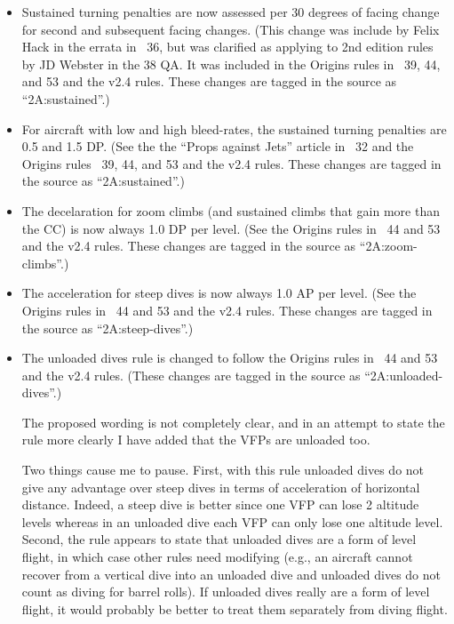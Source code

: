 \documentclass[10pt]{article}
\begin{document}
\begin{itemize}
    \item Sustained turning penalties are now assessed per 30 degrees of facing change for second and subsequent facing changes. (This change was include by Felix Hack in the errata in {\APJ}~36, but was clarified as applying to 2nd edition rules by JD Webster in the {\APJ} 38 QA. It was included in the Origins rules in {\APJ}~39, 44, and 53 and the v2.4 rules. These changes are tagged in the source as “2A:sustained”.)

    \item For aircraft with low and high bleed-rates, the sustained turning penalties are 0.5 and 1.5 DP. (See the the “Props against Jets” article in {\APJ}~32 and the Origins rules {\APJ}~39, 44, and 53 and the v2.4 rules. These changes are tagged in the source as “2A:sustained”.) 

    \item The decelaration for zoom climbs (and sustained climbs that gain more than the CC) is now always 1.0 DP per level. (See the Origins rules {in \APJ}~44 and 53 and the v2.4 rules. These changes are tagged in the source as “2A:zoom-climbs”.) 

    \item The acceleration for steep dives is now always 1.0 AP per level. (See the Origins rules in {\APJ}~44 and 53 and the v2.4 rules. These changes are tagged in the source as “2A:steep-dives”.)

    \item The unloaded dives rule is changed to follow the Origins rules in {\APJ}~44 and 53 and the v2.4 rules. (These changes are tagged in the source as “2A:unloaded-dives”.) 
    
    The proposed wording is not completely clear, and in an attempt to state the rule more clearly I have added that the VFPs are unloaded too. 
    
    Two things cause me to pause. First, with this rule unloaded dives do not give any advantage over steep dives in terms of acceleration of horizontal distance. Indeed, a steep dive is better since one VFP can lose 2 altitude levels whereas in an unloaded dive each VFP can only lose one altitude level. Second, the rule appears to state that unloaded dives are a form of level flight, in which case other rules need modifying (e.g., an aircraft cannot recover from a vertical dive into an unloaded dive and unloaded dives do not count as diving for barrel rolls). If unloaded dives really are a form of level flight, it would probably be better to treat them separately from diving flight.

\end{itemize}
\end{document}
